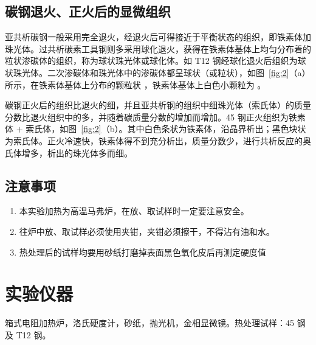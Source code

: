 \documentclass[a4paper,utf8]{article}
\newcommand{\fgref}[1]{图~\ref{#1}\xspace}
\begin{document}
    \subsection{碳钢退火、正火后的显微组织}
        亚共析碳钢一般采用完全退火，经退火后可得接近于平衡状态的组织，即铁素体加珠光体。过共析碳素工具钢则多采用球化退火，获得在铁素体基体上均匀分布着的粒状渗碳体的组织，称为球状珠光体或球化体。如 T12 钢经球化退火后组织为球状珠光体。二次渗碳体和珠光体中的渗碳体都呈球状（或粒状），如\fgref{fig:2}（a）所示，在铁素体基体上分布的颗粒状 ，铁素体基体上白色小颗粒为 。\par
        碳钢正火后的组织比退火的细，并且亚共析钢的组织中细珠光体（索氏体）的质量分数比退火组织中的多，并随着碳质量分数的增加而增加。45 钢正火组织为铁素体 $+$ 索氏体，如\fgref{fig:2}（b）。其中白色条状为铁素体，沿晶界析出；黑色块状为索氏体。正火冷速快，铁素体得不到充分析出，质量分数少，进行共析反应的奥氏体增多，析出的珠光体多而细。
    \subsection{注意事项}
    \begin{enumerate}
        \item 本实验加热为高温马弗炉，在放、取试样时一定要注意安全。
        \item 往炉中放、取试样必须使用夹钳，夹钳必须擦干，不得沾有油和水。
        \item 热处理后的试样均要用砂纸打磨掉表面黑色氧化皮后再测定硬度值
    \end{enumerate}
\section{实验仪器}%
    箱式电阻加热炉，洛氏硬度计，砂纸，抛光机，金相显微镜。热处理试样：45 钢及 T12 钢。
\end{document}
